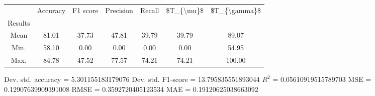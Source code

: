 \begin{tabular}{|c|c|c|c|c|c|c|}
\toprule
{} &  Accuracy &  F1 score &  Precision &  Recall &  \$T\_\{\textbackslash mu\}\$ &  \$T\_\{\textbackslash gamma\}\$ \\
Results &           &           &            &         &            &               \\
\hline
Mean    &     81.01 &     37.73 &      47.81 &   39.79 &      39.79 &         89.07 \\
Min.    &     58.10 &      0.00 &       0.00 &    0.00 &       0.00 &         54.95 \\
Max.    &     84.78 &     47.52 &      77.57 &   74.21 &      74.21 &        100.00 \\
\bottomrule
\end{tabular}

 Dev. std. accuracy = 5.301155183179076
 Dev. std. F1-score = 13.795835551893044
 $R^2$ = 0.05610919515789703
 MSE = 0.12907639909391008
 RMSE = 0.3592720405123534
 MAE = 0.19120625038663092